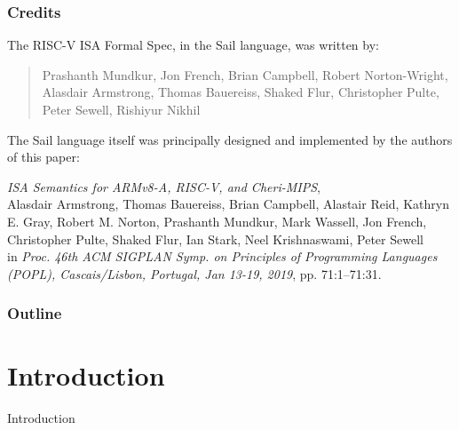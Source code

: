 \documentclass[aspectratio=169]{beamer}
\newcommand{\slidefont}{\scriptsize}
\begin{document}
\begin{frame}[fragile]
  \frametitle{Credits}

  \slidefont

  The RISC-V ISA Formal Spec, in the Sail language, was written by:

  \begin{quote}
    Prashanth Mundkur,
    Jon French,
    Brian Campbell,
    Robert Norton-Wright,
    Alasdair Armstrong,
    Thomas Bauereiss,
    Shaked Flur,
    Christopher Pulte,
    Peter Sewell,
    Rishiyur Nikhil
  \end{quote}

  \vspace{4ex}

  The Sail language itself was principally designed and implemented by
  the authors of this paper:

  \vspace{1ex}

  \hfill \begin{minipage}{0.95\textwidth}
    \emph{ISA Semantics for ARMv8-A, RISC-V, and Cheri-MIPS}, \\
    Alasdair Armstrong,
    Thomas Bauereiss,
    Brian Campbell,
    Alastair Reid,
    Kathryn E. Gray,
    Robert M. Norton,
    Prashanth Mundkur,
    Mark Wassell,
    Jon French,
    Christopher Pulte,
    Shaked Flur,
    Ian Stark,
    Neel Krishnaswami,
    Peter Sewell \\
    in \emph{Proc. 46th ACM SIGPLAN Symp. on Principles of Programming
    Languages (POPL), Cascais/Lisbon, Portugal, Jan 13-19, 2019},
    pp. 71:1--71:31.
  \end{minipage}

\end{frame}


\begin{frame}[fragile]
  \frametitle{Outline}
  \tableofcontents
\end{frame}


\section{Introduction}


\begin{frame}[fragile]

  \slidefont

  \vfill

  \begin{center}\LARGE
    Introduction
  \end{center}

  \vfill

\end{frame}
\end{document}

